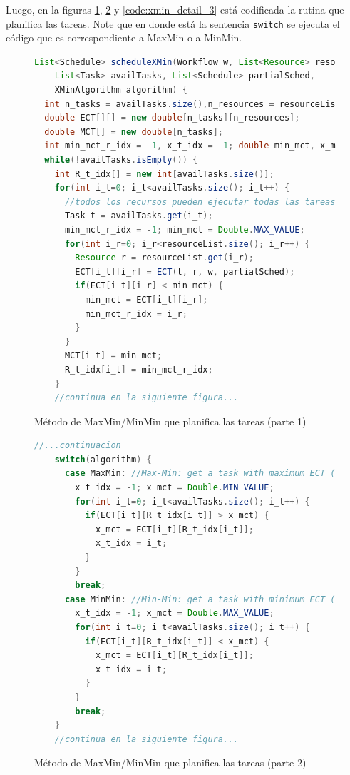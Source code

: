 Luego, en la figuras \ref{code:xmin_detail_1}, \ref{code:xmin_detail_2} y \ref{code:xmin_detail_3}  está codificada la rutina que planifica las tareas. Note que en donde está la sentencia \texttt{switch} se ejecuta el código que es correspondiente a MaxMin o a MinMin.

\begin{figure}
\label{code:xmin_detail_1}
\begin{lstlisting}[language=java]
List<Schedule> scheduleXMin(Workflow w, List<Resource> resourceList, 
    List<Task> availTasks, List<Schedule> partialSched, 
    XMinAlgorithm algorithm) {
  int n_tasks = availTasks.size(),n_resources = resourceList.size();
  double ECT[][] = new double[n_tasks][n_resources];
  double MCT[] = new double[n_tasks];
  int min_mct_r_idx = -1, x_t_idx = -1; double min_mct, x_mct;
  while(!availTasks.isEmpty()) {
    int R_t_idx[] = new int[availTasks.size()];
    for(int i_t=0; i_t<availTasks.size(); i_t++) {
      //todos los recursos pueden ejecutar todas las tareas
      Task t = availTasks.get(i_t);
      min_mct_r_idx = -1; min_mct = Double.MAX_VALUE;
      for(int i_r=0; i_r<resourceList.size(); i_r++) {
        Resource r = resourceList.get(i_r);
        ECT[i_t][i_r] = ECT(t, r, w, partialSched);
        if(ECT[i_t][i_r] < min_mct) {
          min_mct = ECT[i_t][i_r];
          min_mct_r_idx = i_r;
        }
      }
      MCT[i_t] = min_mct;
      R_t_idx[i_t] = min_mct_r_idx;
    }
    //continua en la siguiente figura...
\end{lstlisting}
\caption{Método de MaxMin/MinMin que planifica las tareas (parte 1)}
\end{figure}
    

\begin{figure}
\label{code:xmin_detail_2}
\begin{lstlisting}[language=java]
    //...continuacion
    switch(algorithm) {
      case MaxMin: //Max-Min: get a task with maximum ECT ( t , r ) over tasks
        x_t_idx = -1; x_mct = Double.MIN_VALUE;
        for(int i_t=0; i_t<availTasks.size(); i_t++) {
          if(ECT[i_t][R_t_idx[i_t]] > x_mct) {
            x_mct = ECT[i_t][R_t_idx[i_t]];
            x_t_idx = i_t;
          }
        }
        break;
      case MinMin: //Min-Min: get a task with minimum ECT ( t , r ) over tasks
        x_t_idx = -1; x_mct = Double.MAX_VALUE;
        for(int i_t=0; i_t<availTasks.size(); i_t++) {
          if(ECT[i_t][R_t_idx[i_t]] < x_mct) {
            x_mct = ECT[i_t][R_t_idx[i_t]];
            x_t_idx = i_t;
          }
        }
        break;
    }
    //continua en la siguiente figura...
\end{lstlisting}
\caption{Método de MaxMin/MinMin que planifica las tareas (parte 2)}
\end{figure}



